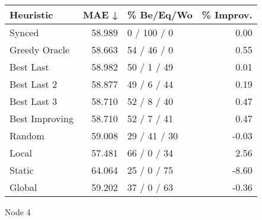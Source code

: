\begin{tabular}{lrlr}
\toprule
\textbf{Heuristic} & \textbf{MAE ↓} & \textbf{\% Be/Eq/Wo} & \textbf{\% Improv.} \\
\midrule
            Synced &         58.989 &          0 / 100 / 0 &                0.00 \\
     Greedy Oracle &         58.663 &          54 / 46 / 0 &                0.55 \\
         Best Last &         58.982 &          50 / 1 / 49 &                0.01 \\
       Best Last 2 &         58.877 &          49 / 6 / 44 &                0.19 \\
       Best Last 3 &         58.710 &          52 / 8 / 40 &                0.47 \\
    Best Improving &         58.710 &          52 / 7 / 41 &                0.47 \\
            Random &         59.008 &         29 / 41 / 30 &               -0.03 \\
             Local &         57.481 &          66 / 0 / 34 &                2.56 \\
            Static &         64.064 &          25 / 0 / 75 &               -8.60 \\
            Global &         59.202 &          37 / 0 / 63 &               -0.36 \\
\bottomrule
\end{tabular}
\caption{Node 4}
\label{tab:iid_lr01_le2_bs4_4}
